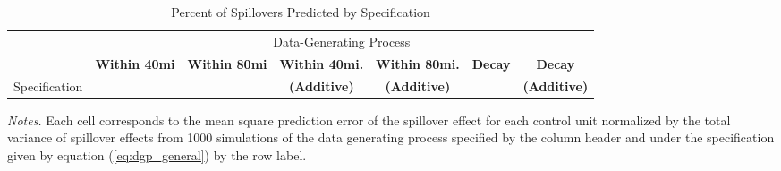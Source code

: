 \documentclass[11pt]{article}
\begin{document}
\begin{table}[!tb]
    \caption{Percent of Spillovers Predicted by Specification}
    \label{tab:misspecification_mspe}

    \begin{adjustbox}{width = 1.1\textwidth, center}
        \begin{threeparttable}
            \begin{tabular}{@{} l rrrrrr @{}}
                \toprule
                & \multicolumn{6}{c}{Data-Generating Process} \\
                \cmidrule{2-7}

                & \multicolumn{1}{c}{\textbf{Within 40mi}} & \multicolumn{1}{c}{\textbf{Within 80mi}} & \multicolumn{1}{c}{\textbf{Within 40mi.}} & \multicolumn{1}{c}{\textbf{Within 80mi.}} & \multicolumn{1}{c}{\textbf{Decay}} & \multicolumn{1}{c}{\textbf{Decay}} \\
                Specification & & & \multicolumn{1}{c}{\textbf{(Additive)}} & \multicolumn{1}{c}{\textbf{(Additive)}} & & \multicolumn{1}{c}{\textbf{(Additive)}} \\
 
                \midrule
                
                
                
                
                \bottomrule
            \end{tabular}
            
            \begin{tablenotes}\footnotesize
                \item \textit{Notes.} Each cell corresponds to the mean square prediction error of the spillover effect for each control unit normalized by the total variance of spillover effects from 1000 simulations of the data generating process specified by the column header and under the specification given by equation (\ref{eq:dgp_general}) by the row label. 
            \end{tablenotes}
        \end{threeparttable}
    \end{adjustbox}
\end{table}
\end{document}
